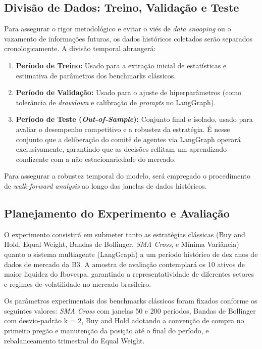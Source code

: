 \documentclass{eic-bcc-tcc}
\begin{document}
\subsection{Divisão de Dados: Treino, Validação e Teste}
Para assegurar o rigor metodológico e evitar o viés de \textit{data snooping} ou o vazamento de informações futuras, os dados históricos coletados serão separados cronologicamente. A divisão temporal abrangerá:
\begin{enumerate}
    \item \textbf{Período de Treino:} Usado para a extração inicial de estatísticas e estimativa de parâmetros dos benchmarks clássicos.
    \item \textbf{Período de Validação:} Usado para o ajuste de hiperparâmetros (como tolerância de \textit{drawdown} e calibração de \textit{prompts} no LangGraph).
    \item \textbf{Período de Teste (\textit{Out-of-Sample}):} Conjunto final e isolado, usado para avaliar o desempenho competitivo e a robustez da estratégia. É nesse conjunto que a deliberação do comitê de agentes via LangGraph operará exclusivamente, garantindo que as decisões reflitam um aprendizado condizente com a não estacionariedade do mercado.
\end{enumerate}
Para assegurar a robustez temporal do modelo, será empregado o procedimento de \textit{walk-forward analysis} ao longo das janelas de dados históricos.

\subsection{Planejamento do Experimento e Avaliação}

O experimento consistirá em submeter tanto as estratégias clássicas (Buy and Hold, Equal Weight, Bandas de Bollinger, \textit{SMA Cross}, e Mínima Variância) quanto o sistema multiagente (LangGraph) a um período histórico de dez anos de dados de mercado da B3. A amostra de avaliação contemplará os 10 ativos de maior liquidez do Ibovespa, garantindo a representatividade de diferentes setores e regimes de volatilidade no mercado brasileiro.

Os parâmetros experimentais dos benchmarks clássicos foram fixados conforme os seguintes valores: \textit{SMA Cross} com janelas 50 e 200 períodos, Bandas de Bollinger com desvio-padrão k = 2, Buy and Hold adotando a convenção de compra no primeiro pregão e manutenção da posição até o final do período, e rebalanceamento trimestral do Equal Weight.
\end{document}
